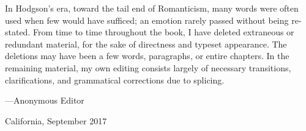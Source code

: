 \documentclass{novel} %
\begin{document}
In Hodgson’s era, toward the tail end of Romanticism, many words were often used when few would have sufficed; an emotion rarely passed without being re-stated. From time to time throughout the book, I have deleted extraneous or redundant material, for the sake of directness and typeset appearance. The deletions may have been a few words, paragraphs, or entire chapters. In the remaining material, my own editing consists largely of necessary transitions, clarifications, and grammatical corrections due to splicing.\par
\null
\stake\hfill---Anonymous Editor\par
\stake\hfill California, September 2017\par
\thispagestyle{empty} %
\cleartorecto
\end{document}
